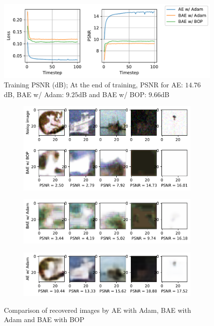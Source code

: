 \begin{figure}[!ht]
    \centering
    \includegraphics[scale=0.75]{fig/AEtradionalBNNBOP.pdf}
    \caption{Training PSNR (dB); At the end of training, PSNR for AE: $14.76$dB, BAE w/ Adam: $9.25$dB and BAE w/ BOP: $9.66$dB}
    \label{fig:AE}
\end{figure}


\begin{figure}[ht]
\centering
    \begin{subfigure}{0.98\textwidth}
        \includegraphics[width=1.\linewidth]{fig/BAEBOPfigsbestworst.pdf}
    \end{subfigure}
    \begin{subfigure}{0.98\textwidth}
        \includegraphics[width=1.\linewidth]{fig/BAEAdamfigsbestworst.pdf}
    \end{subfigure}
    \begin{subfigure}{0.98\textwidth}
        \includegraphics[width=1.\linewidth]{fig/AEAdamfigsbestworst.pdf}
    \end{subfigure}
    \caption{Comparison of recovered images by AE with Adam, BAE with Adam and BAE with BOP}
    \label{fig:AEfig}
\end{figure}

